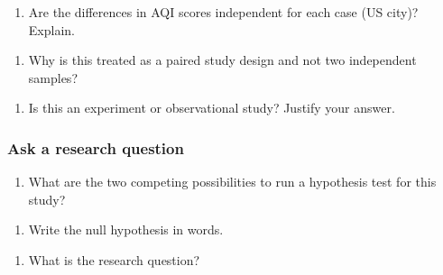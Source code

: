 \documentclass[
]{report}
\providecommand{\tightlist}{%
  \setlength{\itemsep}{0pt}\setlength{\parskip}{0pt}}
\begin{document}
\begin{enumerate}
\def\labelenumi{\arabic{enumi}.}
\setcounter{enumi}{2}
\tightlist
\item
  Are the differences in AQI scores independent for each case (US city)? Explain.
\end{enumerate}

\vspace{0.5in}

\begin{enumerate}
\def\labelenumi{\arabic{enumi}.}
\setcounter{enumi}{3}
\tightlist
\item
  Why is this treated as a paired study design and not two independent samples?
\end{enumerate}

\vspace{0.5in}

\begin{enumerate}
\def\labelenumi{\arabic{enumi}.}
\setcounter{enumi}{4}
\tightlist
\item
  Is this an experiment or observational study? Justify your answer.
\end{enumerate}

\vspace{0.5in}

\hypertarget{ask-a-research-question-2}{%
\subsubsection*{Ask a research question}\label{ask-a-research-question-2}}

\begin{enumerate}
\def\labelenumi{\arabic{enumi}.}
\setcounter{enumi}{5}
\tightlist
\item
  What are the two competing possibilities to run a hypothesis test for this study?
\end{enumerate}

\vspace{1in}

\begin{enumerate}
\def\labelenumi{\arabic{enumi}.}
\setcounter{enumi}{6}
\tightlist
\item
  Write the null hypothesis in words.
\end{enumerate}

\vspace{1in}

\begin{enumerate}
\def\labelenumi{\arabic{enumi}.}
\setcounter{enumi}{7}
\tightlist
\item
  What is the research question?
\end{enumerate}
\end{document}

